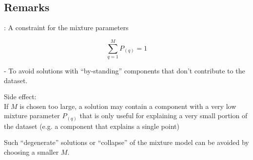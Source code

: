 \subsection{Remarks}

\begin{frame}{\subsecname: A constraint for the mixture parameters}


\svspace{-5mm}

\begin{equation}
\sum_{q=1}^M P_{(q)} = 1
\end{equation}

\pause

- To avoid solutions with ``by-standing'' components that don't contribute to the dataset.

Side effect:\\

If $M$ is chosen too large, a solution may contain a component with a very low mixture parameter $P_{(q)}$ that is only useful for explaining a very small portion of the dataset (e.g. a component that explains a single point)

Such ``degenerate'' solutions or ``collapse'' of the mixture model can be avoided by choosing a smaller $M$.

\end{frame}
